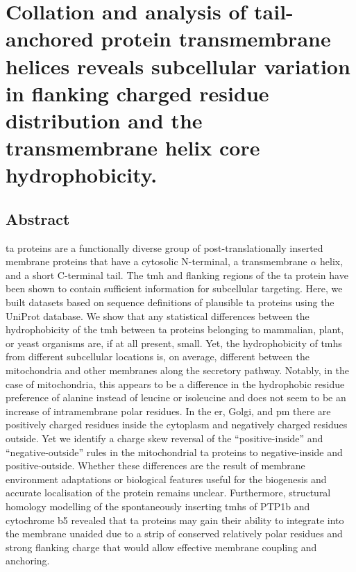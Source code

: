 \chapter{Collation and analysis of tail-anchored protein transmembrane helices reveals subcellular variation in flanking charged residue distribution and the transmembrane helix core hydrophobicity.}

\sloppy

\section{Abstract}

\gls{ta} proteins are a functionally diverse group of post\--translationally inserted membrane proteins that have a cytosolic N-terminal, a transmembrane $\alpha$ helix, and a short C\--terminal tail.
The \gls{tmh} and flanking regions of the \gls{ta} protein have been shown to contain sufficient information for subcellular targeting.
Here, we built datasets based on sequence definitions of plausible \gls{ta} proteins using the  UniProt database.
We show that any statistical differences between the hydrophobicity of the \gls{tmh} between \gls{ta} proteins belonging to mammalian, plant, or yeast organisms are, if at all present, small.
Yet, the hydrophobicity of \gls{tmh}s from different subcellular locations is, on average, different between the mitochondria and other membranes along the secretory pathway.
Notably, in the case of mitochondria, this appears to be a difference in the hydrophobic residue preference of alanine instead of leucine or isoleucine and does not seem to be an increase of intramembrane polar residues.
In the \gls{er}, Golgi, and \gls{pm} there are positively charged residues inside the cytoplasm and negatively charged residues outside.
Yet we identify a charge skew reversal of the ``positive\--inside'' and ``negative\--outside'' rules in the mitochondrial \gls{ta} proteins to negative\--inside and positive\--outside.
Whether these differences are the result of membrane environment adaptations or biological features useful for the biogenesis and accurate localisation of the protein remains unclear.
Furthermore, structural homology modelling of the spontaneously inserting \gls{tmh}s of PTP1b and cytochrome b5 revealed that \gls{ta} proteins may gain their ability to integrate into the membrane unaided due to a strip of conserved relatively polar residues and strong flanking charge that would allow effective membrane coupling and anchoring.


